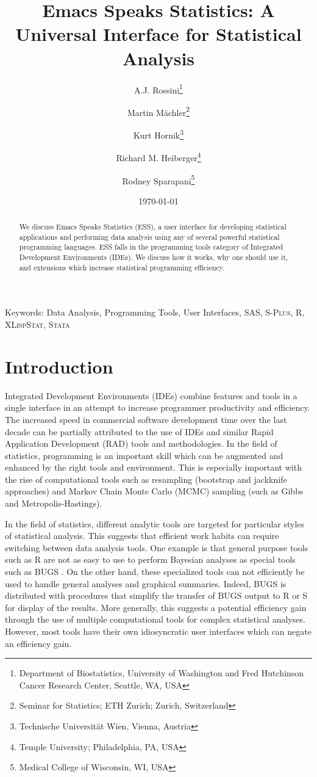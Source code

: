 \documentclass{article}
\title{Emacs Speaks Statistics: A Universal Interface for
  Statistical Analysis}
\author{A.J. Rossini\footnote{Department of Biostatistics, University
    of Washington and Fred Hutchinson Cancer Research Center, Seattle,
    WA, USA} \and Martin M{\"a}chler\footnote{Seminar for Statistics;
    ETH Zurich; Zurich, Switzerland} \and Kurt
  Hornik\footnote{Technische Universit{\"a}t Wien, Vienna, Austria}
  \and Richard M. Heiberger\footnote{Temple University; Philadelphia,
    PA, USA} \and Rodney Sparapani\footnote{Medical College of
    Wisconsin, WI, USA}}
\date{\today}
\newif\ifpdf
\newcommand*{\Splus}{\textsc{S-Plus}}
\newcommand*{\XLispStat}{\textsc{XLispStat}}
\newcommand*{\Stata}{\textsc{Stata}}
\begin{document}
\ifpdf
  \DeclareGraphicsExtensions{.jpg,.pdf,.png,.mps}
\fi


\maketitle

Keywords: Data Analysis, Programming Tools, User Interfaces, SAS,
\Splus, R, \XLispStat, \Stata

\begin{abstract}
  We discuss Emacs Speaks Statistics (ESS), a user interface for
  developing statistical applications and performing data analysis
  using any of several powerful statistical programming languages.
  ESS falls in the programming tools category of Integrated
  Development Environments (IDEs).  We discuss how it works, why one
  should use it, and extensions which increase statistical programming
  efficiency.
\end{abstract}

\section{Introduction}
\label{sec:intro}

Integrated Development Environments (IDEs) combine features and tools
in a single interface in an attempt to increase programmer
productivity and efficiency.  The increased speed in commercial
software development time over the last decade can be partially
attributed to the use of IDEs and similar Rapid Application
Development (RAD) tools and methodologies.  In the field of
statistics, programming is an important skill which can be augmented
and enhanced by the right tools and environment.  This is especially
important with the rise of computational tools such as resampling
(bootstrap and jackknife approaches) and Markov Chain Monte Carlo
(MCMC) sampling (such as Gibbs and Metropolis-Hastings).

In the field of statistics, different analytic tools are targeted for
particular styles of statistical analysis.  This suggests that
efficient work habits can require switching between data analysis
tools.  One example is that general purpose tools such as R
\citep{ihak:gent:1996} are not as easy to use to perform Bayesian
analyses as special tools such as BUGS \citep{SpieThomBest:1999}.  On
the other hand, these specialized tools can not efficiently be used to
handle general analyses and graphical summaries.  Indeed, BUGS is distributed
with procedures that simplify the transfer of BUGS output
to R or S for display of the results.  More generally, this suggests a
potential efficiency gain through the use of multiple
computational tools for complex statistical analyses.  However, most
tools have their own idiosyncratic user interfaces which can
negate an efficiency gain.
\end{document}
